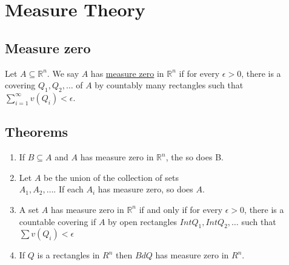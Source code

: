 \section{Measure Theory}

\subsection{Measure zero}
	\label{measure_zero}
	Let $A\subseteq \mathbb{R}^n$. We say $A$ has \underline{measure zero}
	in $\mathbb{R}^n$ if for every $\epsilon>0$, there is a covering $Q_1, Q_2, \dots$ of $A$
	by countably many rectangles such that
	$\sum_{i=1}^\infty v(Q_i)<\epsilon$.



\subsection{Theorems}
\begin{enumerate}
  \item If $B \subseteq A$ and $A$ has measure zero in $\mathbb{R}^n$, the so does B.
  \item Let $A$ be the union of the collection of sets\\
        $A_1, A_2, \ldots$.
        If each $A_i$ has measure zero, so does $A$.
  \item A set $A$ has measure zero in $\mathbb{R}^n$ if and only if for every $\epsilon > 0$,
  there is a countable covering if $A$ by open rectangles $Int Q_1, Int Q_2, \ldots$ such that
  $\sum v(Q_i)<\epsilon$
  \item If $Q$ is a rectangles in $R^n$ then $Bd Q$ has measure zero in $R^n$.
\end{enumerate}